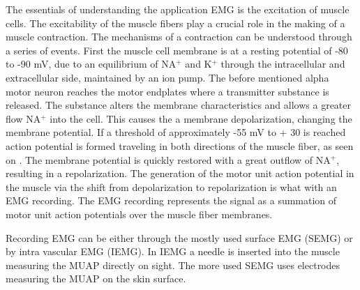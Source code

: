 The essentials of understanding the application EMG is the excitation of muscle cells. The excitability of the muscle fibers play a crucial role in the making of a muscle contraction. The mechanisms of a contraction can be understood through a series of events. First the muscle cell membrane is at a resting potential of -80 to -90 mV, due to an equilibrium of NA$^+$ and K$^+$ through the intracellular and extracellular side, maintained by an ion pump. The before mentioned alpha motor neuron reaches the motor endplates where a transmitter substance is released. The substance alters the membrane characteristics and allows a greater flow NA$^+$ into the cell. This causes the a membrane depolarization, changing the membrane potential. If a threshold of approximately -55 mV to + 30 is reached action potential is formed traveling in both directions of the muscle fiber, as seen on . The membrane potential is quickly restored with a great outflow of NA$^+$, resulting in a repolarization. The generation of the motor unit action potential in the muscle via the shift from depolarization to repolarization is what with an EMG recording. The EMG recording represents the signal as a summation of motor unit action potentials over the muscle fiber membranes.\cite{Cram2012,Martini2012} 

Recording EMG can be either through the mostly used surface EMG (SEMG) or by intra vascular EMG (IEMG). In IEMG a needle is inserted into the muscle measuring the MUAP directly on sight. The more used SEMG uses electrodes measuring the MUAP on the skin surface.\cite{Cram2012} 




 
 



